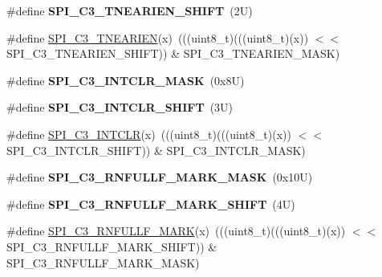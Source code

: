 \begin{DoxyCompactItemize}
\mbox{\label{group___s_p_i___register___masks_ga234a8892dccccf92e27fc91b942c42df}} 
\#define {\bfseries S\+P\+I\+\_\+\+C3\+\_\+\+T\+N\+E\+A\+R\+I\+E\+N\+\_\+\+S\+H\+I\+FT}~(2\+U)
\item 
\#define \mbox{\hyperlink{group___s_p_i___register___masks_ga88a0a8e1d687799a3657127c7e7fe7df}{S\+P\+I\+\_\+\+C3\+\_\+\+T\+N\+E\+A\+R\+I\+EN}}(x)~(((uint8\+\_\+t)(((uint8\+\_\+t)(x)) $<$$<$ S\+P\+I\+\_\+\+C3\+\_\+\+T\+N\+E\+A\+R\+I\+E\+N\+\_\+\+S\+H\+I\+FT)) \& S\+P\+I\+\_\+\+C3\+\_\+\+T\+N\+E\+A\+R\+I\+E\+N\+\_\+\+M\+A\+SK)
\item 
\mbox{\label{group___s_p_i___register___masks_gab9ebf3262935069bc058301414a2aa27}} 
\#define {\bfseries S\+P\+I\+\_\+\+C3\+\_\+\+I\+N\+T\+C\+L\+R\+\_\+\+M\+A\+SK}~(0x8\+U)
\item 
\mbox{\label{group___s_p_i___register___masks_ga2334d28efbe27b7c5e33b834e7045477}} 
\#define {\bfseries S\+P\+I\+\_\+\+C3\+\_\+\+I\+N\+T\+C\+L\+R\+\_\+\+S\+H\+I\+FT}~(3\+U)
\item 
\#define \mbox{\hyperlink{group___s_p_i___register___masks_ga59aa9fd384057a9b902b45c103357729}{S\+P\+I\+\_\+\+C3\+\_\+\+I\+N\+T\+C\+LR}}(x)~(((uint8\+\_\+t)(((uint8\+\_\+t)(x)) $<$$<$ S\+P\+I\+\_\+\+C3\+\_\+\+I\+N\+T\+C\+L\+R\+\_\+\+S\+H\+I\+FT)) \& S\+P\+I\+\_\+\+C3\+\_\+\+I\+N\+T\+C\+L\+R\+\_\+\+M\+A\+SK)
\item 
\mbox{\label{group___s_p_i___register___masks_gadf5d8902e6f7553c8a19c5c309f19c2f}} 
\#define {\bfseries S\+P\+I\+\_\+\+C3\+\_\+\+R\+N\+F\+U\+L\+L\+F\+\_\+\+M\+A\+R\+K\+\_\+\+M\+A\+SK}~(0x10\+U)
\item 
\mbox{\label{group___s_p_i___register___masks_ga12621fd3ffc410b2892a21c8ac880b49}} 
\#define {\bfseries S\+P\+I\+\_\+\+C3\+\_\+\+R\+N\+F\+U\+L\+L\+F\+\_\+\+M\+A\+R\+K\+\_\+\+S\+H\+I\+FT}~(4\+U)
\item 
\#define \mbox{\hyperlink{group___s_p_i___register___masks_gafc4fae698e0516e2d18ecf822cf6de9c}{S\+P\+I\+\_\+\+C3\+\_\+\+R\+N\+F\+U\+L\+L\+F\+\_\+\+M\+A\+RK}}(x)~(((uint8\+\_\+t)(((uint8\+\_\+t)(x)) $<$$<$ S\+P\+I\+\_\+\+C3\+\_\+\+R\+N\+F\+U\+L\+L\+F\+\_\+\+M\+A\+R\+K\+\_\+\+S\+H\+I\+FT)) \& S\+P\+I\+\_\+\+C3\+\_\+\+R\+N\+F\+U\+L\+L\+F\+\_\+\+M\+A\+R\+K\+\_\+\+M\+A\+SK)
$$
\end{DoxyCompactItemize}
